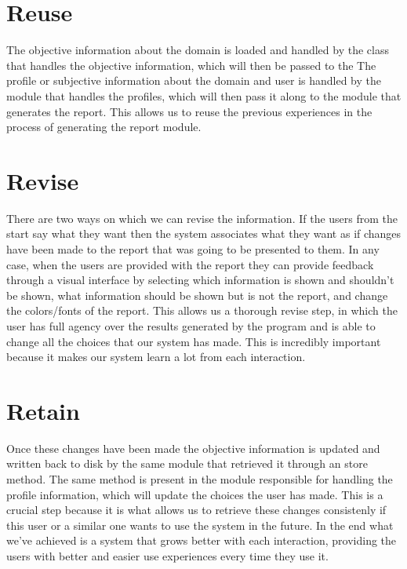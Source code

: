 \section{Reuse}
\label{cap1:sec:reuse}

The objective information about the domain is loaded and handled by the class that handles the objective information, which will then be passed to the 
The profile or subjective information about the domain and user is handled by the module that handles the profiles, which will then pass it along to the module that generates the report.
This allows us to reuse the previous experiences in the process of generating the report module.

\section{Revise}
\label{cap1:sec:revise}
There are two ways on which we can revise the information. If the users from the start say what they want then the system associates what they want as if changes have been made to the report that was going to be presented to them.
In any case, when the users are provided with the report they can provide feedback through a visual interface by selecting which information is shown and shouldn't be shown, what information should be shown but is not the report, and change the colors/fonts of the report.
This allows us a thorough revise step, in which the user has full agency over the results generated by the program and is able to change all the choices that our system has made.
This is incredibly important because it makes our system learn a lot from each interaction.

\section{Retain}
\label{cap1:sec:retain}
Once these changes have been made the objective information is updated and written back to disk by the same module that retrieved it through an store method.
The same method is present in the module responsible for handling the profile information, which will update the choices the user has made.
This is a crucial step because it is what allows us to retrieve these changes consistenly if this user or a similar one wants to use the system in the future.
In the end what we've achieved is a system that grows better with each interaction, providing the users with better and easier use experiences every time they use it.

